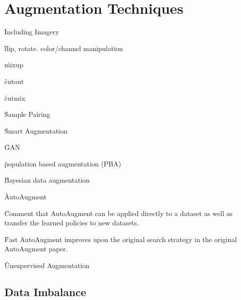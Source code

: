 \chapter{Augmentation Techniques}
\label{app_aug_techniques}

\r{Including Imagery}

\r{flip, rotate. color/channel manipulation}

\r{mixup\cite{zhang2017mixup}}

\r{cutout\cite{devries2017improved}}

\r{cutmix\cite{yun2019cutmix}}





\r{Sample Pairing\cite{inoue2018data}}

\r{Smart Augmentation\cite{lemley2017smart}}

\r{GAN\cite{shrivastava2017learning}}

\r{population based augmentation (PBA)\cite{ho2019population}}

\r{Bayesian data augmentation\cite{tran2017bayesian}}



\r{AutoAugment\cite{cubuk2018autoaugment}}

\r{Comment that AutoAugment can be applied directly to a dataset as well as transfer the learned policies to new datasets.}


\r{Fast AutoAugment\cite{lim2019fast} improves upon the original search strategy in the original AutoAugment paper.}

\r{Unsupervised Augmentation}


\section{Data Imbalance}
\label{app_data_imbalance}



